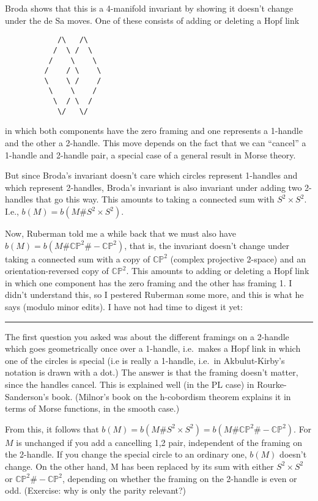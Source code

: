 \documentclass{article}
\begin{document}
Broda shows that this is a 4-manifold invariant by showing it doesn't
change under the de Sa moves. One of these consists of adding or
deleting a Hopf link

\begin{verbatim}
            /\   /\
           /  \ /  \
          /    \    \       
         /    / \    \       
         \    \ /    /
          \    \    /
           \  / \  /
            \/   \/
\end{verbatim}

in which both components have the zero framing and one represents a
1-handle and the other a 2-handle. This move depends on the fact that we
can ``cancel'' a 1-handle and 2-handle pair, a special case of a general
result in Morse theory.

But since Broda's invariant doesn't care which circles represent
1-handles and which represent 2-handles, Broda's invariant is also
invariant under adding two 2-handles that go this way. This amounts to
taking a connected sum with \(S^2 \times S^2\). I.e.,
\(b(M) = b(M\# S^2 \times S^2)\).

Now, Ruberman told me a while back that we must also have
\(b(M) = b(M\#\mathbb{CP}^2\#-\mathbb{CP}^2)\), that is, the invariant
doesn't change under taking a connected sum with a copy of
\(\mathbb{CP}^2\) (complex projective 2-space) and an
orientation-reversed copy of \(\mathbb{CP}^2\). This amounts to adding
or deleting a Hopf link in which one component has the zero framing and
the other has framing 1. I didn't understand this, so I pestered
Ruberman some more, and this is what he says (modulo minor edits). I
have not had time to digest it yet:

\begin{center}\rule{0.5\linewidth}{0.5pt}\end{center}

The first question you asked was about the different framings on a
2-handle which goes geometrically once over a 1-handle, i.e.~makes a
Hopf link in which one of the circles is special (i.e is really a
1-handle, i.e.~in Akbulut-Kirby's notation is drawn with a dot.) The
answer is that the framing doesn't matter, since the handles cancel.
This is explained well (in the PL case) in Rourke-Sanderson's book.
(Milnor's book on the h-cobordism theorem explains it in terms of Morse
functions, in the smooth case.)

From this, it follows that
\(b(M) = b(M\#S^2 \times S^2) = b(M\#\mathbb{CP}^2\#-\mathbb{CP}^2)\).
For \(M\) is unchanged if you add a cancelling 1,2 pair, independent of
the framing on the 2-handle. If you change the special circle to an
ordinary one, \(b(M)\) doesn't change. On the other hand, M has been
replaced by its sum with either \(S^2 \times S^2\) or
\(\mathbb{CP}^2 \# -\mathbb{CP}^2\), depending on whether the framing on
the 2-handle is even or odd. (Exercise: why is only the parity
relevant?)
\end{document}
